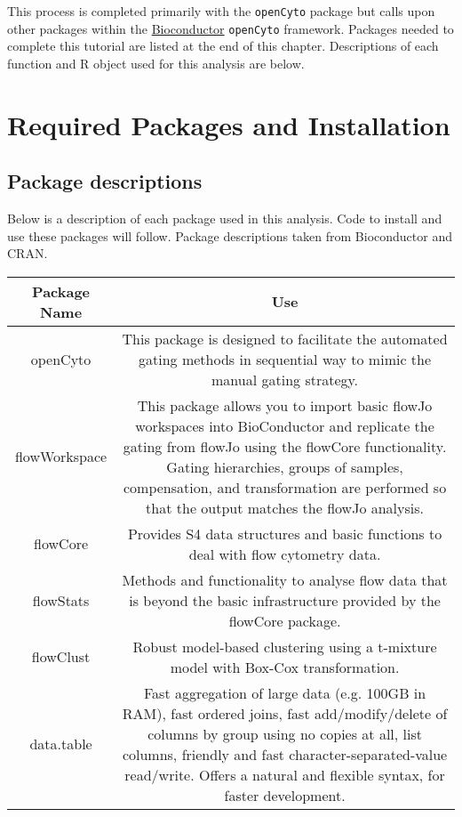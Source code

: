 \documentclass[]{book}
\begin{document}
This process is completed primarily with the \texttt{openCyto} package but calls upon other packages within the \href{http://bioconductor.org/packages/release/bioc/html/openCyto.html}{Bioconductor} \texttt{openCyto} framework. Packages needed to complete this tutorial are listed at the end of this chapter. Descriptions of each function and R object used for this analysis are below.

\hypertarget{required-packages-and-installation}{%
\section{Required Packages and Installation}\label{required-packages-and-installation}}

\hypertarget{package-descriptions}{%
\subsection{Package descriptions}\label{package-descriptions}}

Below is a description of each package used in this analysis. Code to install and use these packages will follow. Package descriptions taken from Bioconductor and CRAN.

\begin{tabular}{c|c}
\hline
Package Name & Use\\
\hline
openCyto & This package is designed to facilitate the automated gating methods in sequential way to mimic the manual gating strategy.\\
\hline
flowWorkspace & This package allows you to import basic flowJo workspaces into BioConductor and replicate the gating from flowJo using the flowCore functionality. Gating hierarchies, groups of samples, compensation, and transformation are performed so that the output matches the flowJo analysis.\\
\hline
flowCore & Provides S4 data structures and basic functions to deal with flow cytometry data.\\
\hline
flowStats & Methods and functionality to analyse flow data that is beyond the basic infrastructure provided by the flowCore package.\\
\hline
flowClust & Robust model-based clustering using a t-mixture model with Box-Cox transformation.\\
\hline
data.table & Fast aggregation of large data (e.g. 100GB in RAM), fast ordered joins, fast add/modify/delete of columns by group using no copies at all, list columns, friendly and fast character-separated-value read/write. Offers a natural and flexible syntax, for faster development.\\
\hline
\end{tabular}
\end{document}
